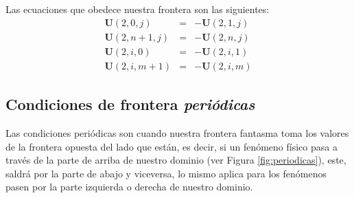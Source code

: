 \documentclass[12pt,a4paper]{book}
\begin{document}
Las ecuaciones que obedece nuestra frontera son las siguientes:
\begin{eqnarray}
\textbf{U}(2,0,j)&=&-\textbf{U}(2,1,j) \\
\textbf{U}(2,n+1,j)&=&-\textbf{U}(2,n,j) \\
\textbf{U}(2,i,0)&=&-\textbf{U}(2,i,1) \\
\textbf{U}(2,i,m+1)&=&-\textbf{U}(2,i,m) 
\end{eqnarray}

\subsection{Condiciones de frontera \emph{periódicas}}
Las condiciones periódicas son cuando nuestra frontera fantasma toma los valores de la frontera opuesta del lado que están, es decir, si un fenómeno físico pasa a través de la parte de arriba de nuestro 
dominio (ver Figura \ref{fig:periodicas}), este, saldrá por la parte de abajo y viceversa, lo mismo aplica para los fenómenos pasen por la parte izquierda o derecha de nuestro dominio.
 
\end{document}
